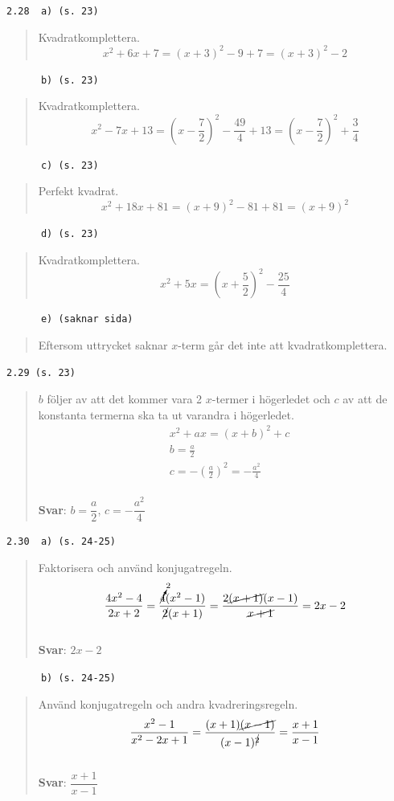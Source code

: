 \documentclass[a4paper]{article}
\newcommand{\tskcol}[1]{\textcolor{tskcol}{#1}}
\begin{document}
	\texttt{\tskcol{2.28~~a) (s. 23)}}
	\begin{quotation}
		\noindent
		Kvadratkomplettera.
		\[x^2+6x+7=(x+3)^2-9+7=(x+3)^2-2\]
	\end{quotation}
	
	\texttt{\tskcol{~~~~~~b) (s. 23)}}
	\begin{quotation}
		\noindent
		Kvadratkomplettera.
		\[x^2-7x+13=(x-\frac{7}{2})^2-\frac{49}{4}+13=(x-\frac{7}{2})^2+\frac{3}{4}\]
	\end{quotation}
	
	\texttt{\tskcol{~~~~~~c) (s. 23)}}
	\begin{quotation}
		\noindent
		Perfekt kvadrat.
		\[x^2+18x+81=(x+9)^2-81+81=(x+9)^2\]
	\end{quotation}
	
	\texttt{\tskcol{~~~~~~d) (s. 23)}}
	\begin{quotation}
		\noindent
		Kvadratkomplettera.
		\[x^2+5x=(x+\frac{5}{2})^2-\frac{25}{4}\]
	\end{quotation}
	
	\texttt{\tskcol{~~~~~~e) (saknar sida)}}
	\begin{quotation}
		\noindent
		Eftersom uttrycket saknar $x$-term går det inte att kvadratkomplettera.
	\end{quotation}
	
	\texttt{\tskcol{2.29 (s. 23)}}
	\begin{quotation}
		\noindent
		$b$ följer av att det kommer vara 2 $x$-termer i högerledet och $c$ av att de konstanta termerna ska ta ut varandra i högerledet.
		\begin{align*}
			& x^2+ax=(x+b)^2+c \\
			& b=\frac{a}{2} \\
			& c=-\left(\frac{a}{2}\right)^2=-\frac{a^2}{4}
		\end{align*}
		\\
		\textbf{Svar}: $b=\dfrac{a}{2}$, $c=-\dfrac{a^2}{4}$
	\end{quotation}
	
	\texttt{\tskcol{2.30~~a) (s. 24-25)}}
	\begin{quotation}
		\noindent
		Faktorisera och använd konjugatregeln.
		\[\dfrac{4x^2-4}{2x+2}=
		\dfrac{\cancelto{2}{4}(x^2-1)}{\cancel{2}(x+1)}=
		\dfrac{2\cancel{(x+1)}(x-1)}{\cancel{x+1}}=
		2x-2\]
		\\
		\textbf{Svar}: $2x-2$
	\end{quotation}
	
	\texttt{\tskcol{~~~~~~b) (s. 24-25)}}
	\begin{quotation}
		\noindent
		Använd konjugatregeln och andra kvadreringsregeln.
		\[\dfrac{x^2-1}{x^2-2x+1}=
		\dfrac{(x+1)\cancel{(x-1)}}{(x-1)^{\cancel{2}}}=
		\dfrac{x+1}{x-1}\]
		\\
		\textbf{Svar}: $\dfrac{x+1}{x-1}$
	\end{quotation}
	
\end{document}
